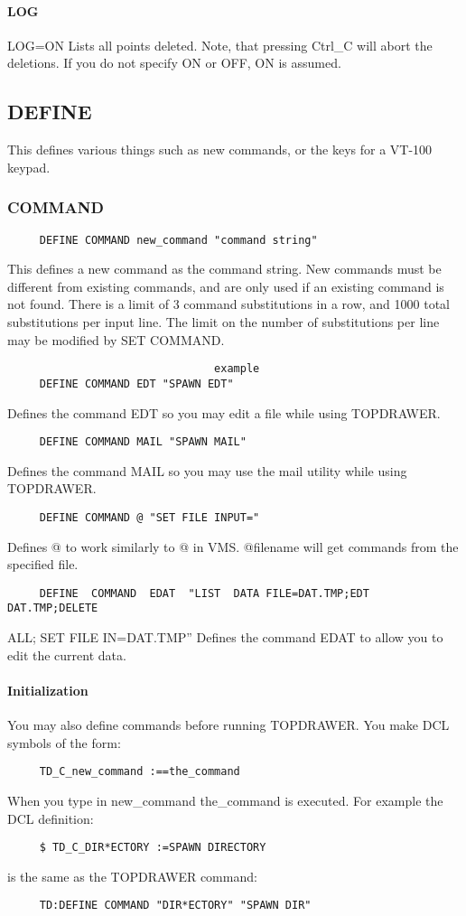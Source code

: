 \paragraph{LOG}
LOG=ON  Lists  all  points  deleted.  Note, that pressing Ctrl\_C will
abort the deletions.  If you do not specify ON or OFF, ON is assumed. 
\subsection{DEFINE}
This  defines  various  things  such  as  new commands, or the keys for a
VT-100 keypad.  
\subsubsection{COMMAND}
\begin{verbatim}
     DEFINE COMMAND new_command "command string" 
\end{verbatim}

This defines a new command as the command string.  New commands must be
different from existing commands, and are  only  used  if  an  existing
command is not found.  There is a limit of 3 command substitutions in a
row, and 1000 total substitutions per input line.   The  limit  on  the
number of substitutions per line may be modified by SET COMMAND.  

\begin{verbatim}
                                example
     DEFINE COMMAND EDT "SPAWN EDT" 
\end{verbatim}
Defines the command EDT so you may edit a file while using TOPDRAWER.  
\begin{verbatim}
     DEFINE COMMAND MAIL "SPAWN MAIL" 
\end{verbatim}
Defines  the  command  MAIL so you may use the mail utility while using
TOPDRAWER.  
\begin{verbatim}
     DEFINE COMMAND @ "SET FILE INPUT=" 
\end{verbatim}
Defines  @  to work similarly to @ in VMS.  @filename will get commands
from the specified file.  
\begin{verbatim}
     DEFINE  COMMAND  EDAT  "LIST  DATA FILE=DAT.TMP;EDT DAT.TMP;DELETE
\end{verbatim}
ALL;  SET FILE IN=DAT.TMP'' 
Defines the command EDAT to allow you to edit the current data.  
\paragraph{Initialization}
You  may also define commands before running TOPDRAWER.  You make DCL
symbols of the form:  
\begin{verbatim}
     TD_C_new_command :==the_command 
\end{verbatim}
When  you  type  in new\_command the\_command is executed.  For example
the DCL definition:  
\begin{verbatim}
     $ TD_C_DIR*ECTORY :=SPAWN DIRECTORY 
\end{verbatim}
is the same as the TOPDRAWER command:  
\begin{verbatim}
     TD:DEFINE COMMAND "DIR*ECTORY" "SPAWN DIR" 
\end{verbatim}
